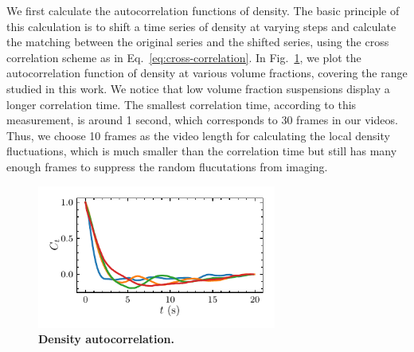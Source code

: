 \documentclass[preprint,aps,prl,amsmath,amssymb,longbibliography]{revtex4-2}
\begin{document}
We first calculate the autocorrelation functions of density. The basic principle of this calculation is to shift a time series of density at varying steps and calculate the matching between the original series and the shifted series, using the cross correlation scheme as in Eq.~\ref{eq:cross-correlation}. In Fig.~\ref{density-autocorrelation}, we plot the autocorrelation function of density at various volume fractions, covering the range studied in this work. We notice that low volume fraction suspensions display a longer correlation time. The smallest correlation time, according to this measurement, is around 1 second, which corresponds to 30 frames in our videos. Thus, we choose 10 frames as the video length for calculating the local density fluctuations, which is much smaller than the correlation time but still has many enough frames to suppress the random flucutations from imaging.


\begin{figure}[!]
\begin{center}
\includegraphics[width=0.7\textwidth]{figures/density-autocorrelation/v1.pdf}
\caption[Density autocorrelation]
{
\textbf{Density autocorrelation.}
}
\label{density-autocorrelation}
\end{center}
\end{figure}





\end{document}
